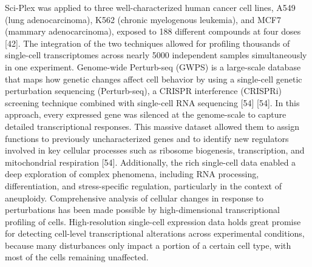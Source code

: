Sci-Plex was applied to three well-characterized human cancer cell lines, A549 (lung adenocarcinoma), K562 (chronic myelogenous leukemia), and MCF7 (mammary adenocarcinoma), exposed to 188 different compounds at four doses [42]. The integration of the two techniques allowed for profiling thousands of single-cell transcriptomes across nearly 5000 independent samples simultaneously in one experiment. Genome-wide Perturb-seq (GWPS) is a large-scale database that maps how genetic changes affect cell behavior by using a single-cell genetic perturbation sequencing (Perturb-seq), a CRISPR interference (CRISPRi) screening technique combined with single-cell RNA sequencing [54]  [54]. In this approach, every expressed gene was silenced at the genome-scale to capture detailed transcriptional responses. This massive dataset allowed them to assign functions to previously uncharacterized genes and to identify new regulators involved in key cellular processes such as ribosome biogenesis, transcription, and mitochondrial respiration [54]. Additionally, the rich single-cell data enabled a deep exploration of complex phenomena, including RNA processing, differentiation, and stress-specific regulation, particularly in the context of aneuploidy. Comprehensive analysis of cellular changes in response to perturbations has been made possible by high-dimensional transcriptional profiling of cells. High-resolution single-cell expression data holds great promise for detecting cell-level transcriptional alterations across experimental conditions, because many disturbances only impact a portion of a certain cell type, with most of the cells remaining unaffected. 
